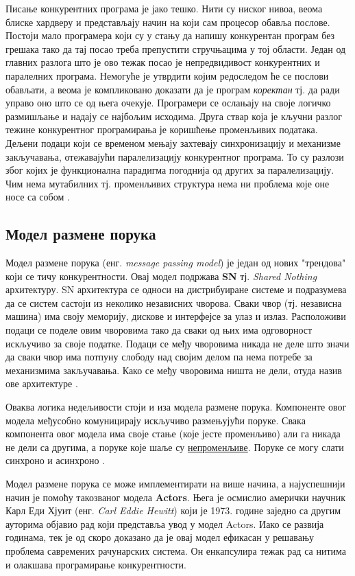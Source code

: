 \documentclass[12pt,oneside]{memoir}
\begin{document}
Писање конкурентних програма је јако тешко. Нити су ниског нивоа, веома блиске хардверу и представљају начин на који сам процесор обавља послове. Постоји мало програмера који су у стању да напишу конкурентан програм без грешака тако да тај посао треба препустити стручњацима у тој области. Један од главних разлога што је ово тежак посао је непредвидивост конкурентних и паралелних програма. Немогуће је утврдити којим редоследом ће се послови обављати, а веома је компликовано доказати да је програм \textit{коректан} тј. да ради управо оно што се од њега очекује. Програмери се ослањају на своје логичко размишљање и надају се најбољим исходима. Друга ствар која је кључни разлог тежине конкурентног програмирања је коришћење променљивих података. Дељени подаци који се временом мењају захтевају синхронизацију и механизме закључавања, отежавајући паралелизацију конкурентног програма. То су разлози због којих је функционална парадигма погоднија од других за паралелизацију. Чим нема мутабилних тј. променљивих структура нема ни проблема које оне носе са собом \cite{progInScala3}.

\subsection{Модел размене порука}

Модел размене порука (енг. \textit{message passing model}) је један од нових "трендова" који се тичу конкурентности. Овај модел подржава \textbf{SN} тј. \textit{Shared Nothing} архитектуру. SN архитектура се односи на дистрибуиране системе и подразумева да се систем састоји из неколико независних чворова. Сваки чвор (тј. независна машина) има своју меморију, дискове и интерфејсе за улаз и излаз. Расположиви подаци се поделе овим чворовима тако да сваки од њих има одговорност искључиво за своје податке. Подаци се међу чворовима никада не деле што значи да сваки чвор има потпуну слободу над својим делом па нема потребе за механизмима закључавања. Како се међу чворовима ништа не дели, отуда назив ове архитектуре \cite{SNvsSD, warehouse}.

Оваква логика недељивости стоји и иза модела размене порука. Компоненте овог модела међусобно комуницирају искључиво размењујући поруке. Свака компонента овог модела има своје стање (које јесте променљиво) али га никада не дели са другима, а поруке које шаље су \underline{непроменљиве}. Поруке се могу слати синхроно и асинхроно \cite{progInScala}.

Модел размене порука се може имплементирати на више начина, а најуспешнији начин је помоћу такозваног модела \textbf{Actors}. Њега је осмислио амерички научник Карл Еди Хјуит (енг. \textit{Carl Eddie Hewitt}) који је 1973. године заједно са другим ауторима објавио рад који представља увод у модел Actors. Иако се развија годинама, тек је од скоро доказано да је овај модел ефикасан у решавању проблема савремених рачунарских система. Он енкапсулира тежак рад са нитима и олакшава програмирање конкурентности. 
\end{document}
